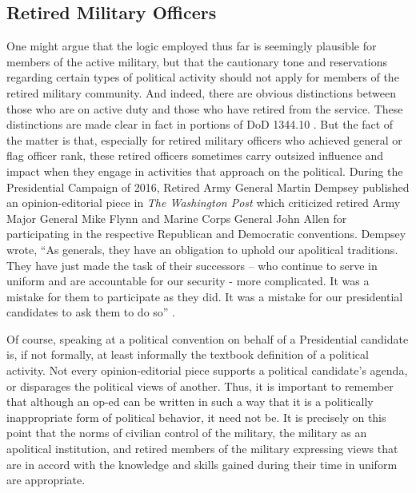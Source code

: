 \documentclass[12pt,]{article}
\begin{document}
\hypertarget{retired-military-officers}{%
\subsection{Retired Military Officers}\label{retired-military-officers}}

One might argue that the logic employed thus far is seemingly plausible for members of the active military, but that the cautionary tone and reservations regarding certain types of political activity should not apply for members of the retired military community. And indeed, there are obvious distinctions between those who are on active duty and those who have retired from the service. These distinctions are made clear in fact in portions of DoD 1344.10 \autocite{department_of_defense_political_2008}. But the fact of the matter is that, especially for retired military officers who achieved general or flag officer rank, these retired officers sometimes carry outsized influence and impact when they engage in activities that approach on the political. During the Presidential Campaign of 2016, Retired Army General Martin Dempsey published an opinion-editorial piece in \emph{The Washington Post} which criticized retired Army Major General Mike Flynn and Marine Corps General John Allen for participating in the respective Republican and Democratic conventions. Dempsey wrote, ``As generals, they have an obligation to uphold our apolitical traditions. They have just made the task of their successors -- who continue to serve in uniform and are accountable for our security - more complicated. It was a mistake for them to participate as they did. It was a mistake for our presidential candidates to ask them to do so'' \autocite{dempsey_military_2016}.

Of course, speaking at a political convention on behalf of a Presidential candidate is, if not formally, at least informally the textbook definition of a political activity. Not every opinion-editorial piece supports a political candidate's agenda, or disparages the political views of another. Thus, it is important to remember that although an op-ed can be written in such a way that it is a politically inappropriate form of political behavior, it need not be. It is precisely on this point that the norms of civilian control of the military, the military as an apolitical institution, and retired members of the military expressing views that are in accord with the knowledge and skills gained during their time in uniform are appropriate.
\end{document}
